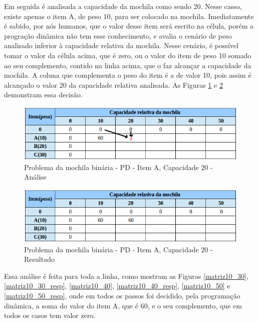 Em seguida é analisada a capacidade da mochila como sendo 20. Nesse casso, existe apenas o item A, de peso 10, para ser colocado na mochila. Imediatamente é sabido, por nós humanos, que o valor desse item será escrito na célula, porém a progração dinâmica não tem esse conhecimento, e avalia o cenário de peso analisado inferior à capacidade relativa da mochila. Nesse cenário, é possível tomar o valor da célula acima, que é zero, ou o valor do item de peso 10 somado ao seu complemento, contido na linha acima, que o faz alcançar a capacidade da mochila. A coluna que complementa o peso do item é a de valor 10, pois assim é alcançado o valor 20 da capacidade relativa analisada. As Figuras \ref{matriz10_20} e \ref{matriz10_20_resp} demonstram essa decisão.

\FloatBarrier
\begin{figure}[!h]
\centering
\includegraphics[keepaspectratio=true,scale=0.6]{figuras/matriz10_20.png}
\caption{Problema da mochila binária - PD - Item A, Capacidade 20 - Análise }
\label{matriz10_20}
\end{figure}

\FloatBarrier
\begin{figure}[!h]
\centering
\includegraphics[keepaspectratio=true,scale=0.6]{figuras/matriz10_20_resp.png}
\caption{Problema da mochila binária - PD - Item A, Capacidade 20 - Resultado}
\label{matriz10_20_resp}
\end{figure}

Essa análise é feita para toda a linha, como mostram as Figuras \ref{matriz10_30}, \ref{matriz10_30_resp}, \ref{matriz10_40}, \ref{matriz10_40_resp}, \ref{matriz10_50} e \ref{matriz10_50_resp}, onde em todos os passos foi decidido, pela programação dinâmica, a soma do valor do item A, que é 60, e o seu complemento, que em todos os casos tem valor zero.

